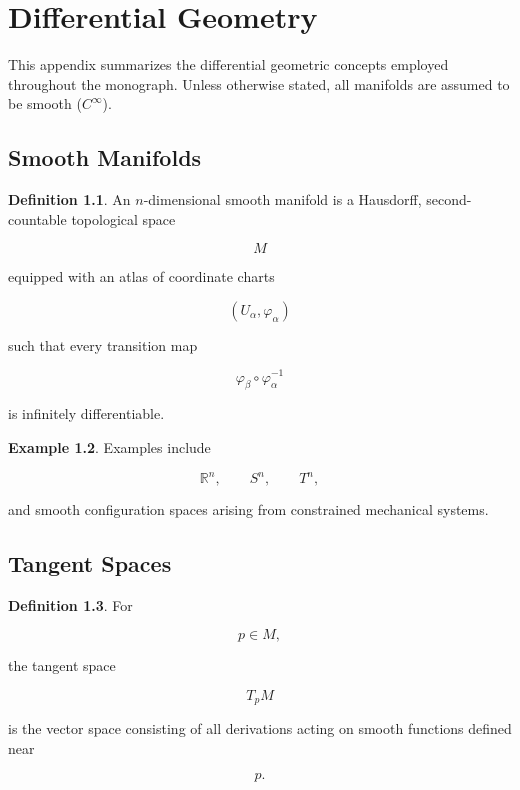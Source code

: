 \documentclass[11pt]{book}
\numberwithin{equation}{chapter}
\theoremstyle{definition}
\newtheorem{definition}{Definition}[chapter]
\newtheorem{example}[definition]{Example}
\theoremstyle{plain}
\begin{document}
\chapter{Differential Geometry}

This appendix summarizes the differential geometric concepts employed
throughout the monograph. Unless otherwise stated, all manifolds are
assumed to be smooth (\(C^\infty\)).


\section{Smooth Manifolds}

\begin{definition}

An \(n\)-dimensional smooth manifold is a Hausdorff,
second-countable topological space

\[
M
\]

equipped with an atlas of coordinate charts

\[
(U_\alpha,\varphi_\alpha)
\]

such that every transition map

\[
\varphi_\beta
\circ
\varphi_\alpha^{-1}
\]

is infinitely differentiable.

\end{definition}


\begin{example}

Examples include

\[
\mathbb{R}^n,
\qquad
S^n,
\qquad
T^n,
\]

and smooth configuration spaces arising from constrained mechanical
systems.

\end{example}


\section{Tangent Spaces}

\begin{definition}

For

\[
p\in M,
\]

the tangent space

\[
T_pM
\]

is the vector space consisting of all derivations acting on smooth
functions defined near

\[
p.
\]

\end{definition}
\end{document}
